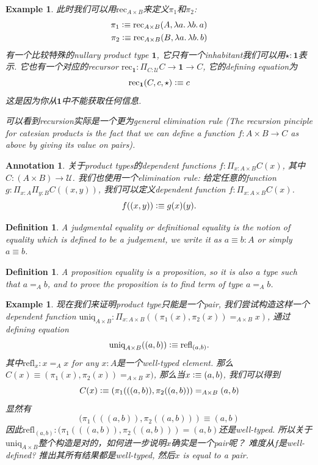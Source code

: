 \documentclass{article}
\newtheorem{example}[theorem]{Example}
\newtheorem{definition}[theorem]{Definition}
\newtheorem{annotation}[theorem]{Annotation}
\newcommand{\lam}[2]{\ensuremath{\lambda #1\ldotp #2}} %
\newcommand{\defeqv}{\vcentcolon\equiv}
\begin{document}
\begin{example}
\rm 此时我们可以用$\text{rec}_{A \times B}$来定义$\pi_1$和$\pi_2$:
\[
	\begin{aligned}
	\pi_1 \defeqv \text{rec}_{A \times B}(A, \lam{a}{\lam{b}{a}}) \\
	\pi_2 \defeqv \text{rec}_{A \times B}(B, \lam{a}{\lam{b}{b}})
	\end{aligned}
\]
有一个比较特殊的nullary product type $\mathbf{1}$, 它只有一个inhabitant我们可以用$\star:\mathbf{1}$表示. 它也有一个对应的recursor $\text{rec}_\mathbf{1}: \Pi_{C:\mathcal{U}} C \to \mathbf{1} \to C$, 它的defining equation为
\[
	\text{rec}_\mathbf{1}(C, c, \star) \defeqv c 
\]
这是因为你从$\mathbf{1}$中不能获取任何信息.

可以看到recursion实际是一个更为general elimination rule (The recursion pinciple for catesian products is the fact that we can define a function $f:A \times B \to C$ as above by giving its value on pairs).
\end{example}

\begin{annotation}
\rm 关于product types的dependent functions $f: \Pi_{x:A\times B}C(x)$, 其中$C: (A \times B) \to \mathcal{U}$. 我们也使用一个elimination rule: 给定任意的function $g:\Pi_{x:A}\Pi_{y:B}C((x,y))$, 我们可以定义dependent function $f: \Pi_{x:A\times B}C(x)$.
\[
	f((x,y)) \defeqv g(x)(y).
\]
\end{annotation}

\begin{definition}
\rm A judgmental equality or definitional equality is the notion of equality which is defined to be a judgement, we write it as $a \equiv b : A$ or simply $a \equiv b$.
\end{definition}

\begin{definition}
\rm A proposition equality is a proposition, so it is also a type such that $a =_A b$, and to prove the proposition is to find term of type $a =_A b$.
\end{definition}

\begin{example}
\rm 现在我们来证明product type只能是一个pair, 我们尝试构造这样一个dependent function $\text{uniq}_{A \times B}:\Pi_{x:A \times B}((\pi_1(x),\pi_2(x)) =_{A \times B} x)$, 通过defining equation
\[
	\text{uniq}_{A \times B}((a,b)) \defeqv \text{refl}_{(a,b)}.
\]
其中$\text{refl}_{x}: x =_A x$ for any $x:A$是一个well-typed element. 那么$C(x) \equiv (\pi_1(x),\pi_2(x)) =_{A \times B} x)$, 那么当$x \defeqv (a,b)$, 我们可以得到
\[
	C(x) \defeqv (\pi_1(((a,b)),\pi_2((a,b))) =_{A \times B} (a,b)
\]
显然有
\[
	(\pi_1(((a,b)),\pi_2((a,b))) \equiv (a,b)
\]
因此$\text{refl}_{(a,b)}: (\pi_1(((a,b)),\pi_2((a,b))) = (a,b)$还是well-typed. 所以关于$\text{uniq}_{A \times B}$整个构造是对的，如何进一步说明$x$确实是一个pair呢？ 难度从$f$是well-defined? 推出其所有结果都是well-typed, 然后$x$ is equal to a pair.
\end{example}
\end{document}
